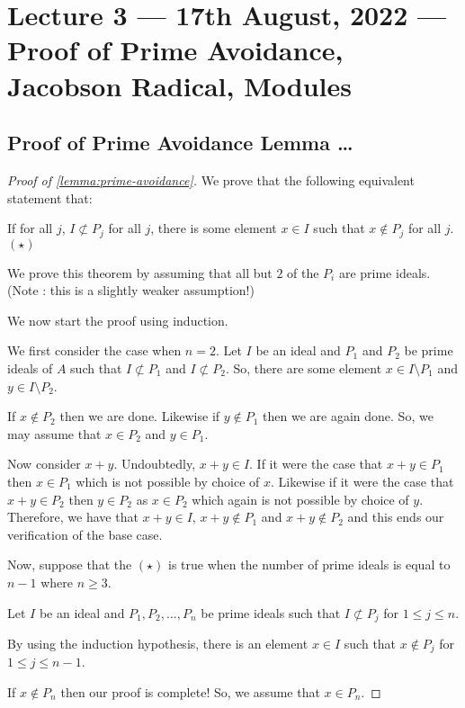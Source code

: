 \section{Lecture 3 --- 17th August, 2022 --- Proof of Prime Avoidance, Jacobson Radical, Modules}
\subsection{Proof of Prime Avoidance Lemma \ldots}
\begin{proof}[Proof of \ref{lemma:prime-avoidance}]
    We prove that the following equivalent statement that:
    
    If for all $j$, $I\not\subset P_j$ for all $j$, there is some element $x\in I$ such that $x\not\in P_j$ for all $j$. $(\star)$


    We prove this theorem by assuming that all but $2$ of the $P_i$ are prime ideals. (Note : this is a slightly weaker assumption!)
    
     We now start the proof using induction.
    
    We first consider the case when $n=2$. Let $I$ be an ideal and $P_1$ and $P_2$ be prime ideals of $A$ such that $I \not \subset P_1$ and $I \not \subset P_2$. So, there are some element $x\in I \setminus P_1$ and $y\in I \setminus P_2$.

    If $x\not \in P_2$ then we are done. Likewise if $y\not \in P_1$ then we are again done. So, we may assume that $x\in P_2$ and $y\in P_1$.

    Now consider $x+y$. Undoubtedly, $x+y \in I$. If it were the case that $x+y \in P_1$ then $x\in P_1$ which is not possible by choice of $x$. Likewise if it were the case that $x+y \in P_2$ then $y \in P_2$ as $x\in P_2$ which again is not possible by choice of $y$. Therefore, we have that $x+y \in I$, $x+y \not \in P_1$ and $x+y \not \in P_2$ and this ends our verification of the base case.

    Now, suppose that the $(\star)$ is true when the number of prime ideals is equal to $n-1$ where $n\ge 3$. 

    Let $I$ be an ideal and $P_1 , P_2 , \ldots , P_n$ be prime ideals such that $I \not \subset P_j$ for $1\le j \le n$. 

    By using the induction hypothesis, there is an element $x\in I$ such that $x \not \in P_j$ for $1 \le j \le n-1$.


    If $x\not\in P_n$ then our proof is complete! So, we assume that $x\in P_n$.
    

\end{proof}
